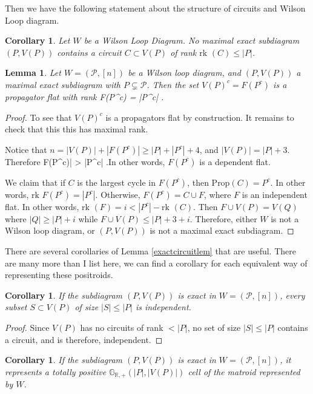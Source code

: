 \documentclass[11pt]{article}
\newcommand{\R}{\mathbb{R}}
\newcommand{\Grtnn}{\mathbb{G}_{\R, +}}
\newcommand{\rk}{\textrm{rk }}
\def\bas #1\eas{\begin{align*} #1 \end{align*}}
\newcommand{\cP}{\mathcal{P}}
\newcommand{\Prop}{\textrm{Prop}}
\newtheorem{lem}[thm]{Lemma}
\newtheorem{cor}[thm]{Corollary}
\theoremstyle{remark}
\theoremstyle{definition}
\begin{document}
Then we have the following statement about the structure of circuits and Wilson Loop diagram.

\begin{cor}
Let $W$ be a Wilson Loop Diagram. No maximal exact subdiagram $(P, V(P))$ contains a circuit $C \subset V(P)$ of rank $\rk(C) \leq |P|$.
\end{cor}


\begin{lem}
Let $W = (\cP, [n])$ be a Wilson loop diagram, and $(P, V(P))$ a maximal exact subdiagram with $P \subsetneq \cP$. Then the set $V(P)^c = F(P^c)$ is a propagator flat with rank  \bas \rk F(P^c) = |P^c| \;. \eas
\end{lem}

\begin{proof}
To see that $V(P)^c$ is a propagators flat by construction. It remains to check that this this has maximal rank.

Notice that $n= |V(P)| + |F(P^c)| \geq |P| + |P^c| +4$, and $|V(P)| = |P| +3$. Therefore \bas |F(P^c)| > |P^c| \;.\eas In other words, $F(P^c)$ is a dependent flat.

We claim that if $C$ is the largest cycle in $F(P^c)$, then $\Prop(C) = P^c$. In other words, $\rk F(P^c) = |P^c|$. Otherwise, $F(P^c) = C \cup F$, where $F$ is an independent flat. In other words, $\rk (F) = i < |P^c| - \rk (C)$. Then $F \cup V(P) = V(Q)$ where $|Q| \geq |P| +i$ while $F \cup V(P) \leq |P| + 3 + i$. Therefore, either $W$ is not a Wilson loop diagram, or $(P, V(P))$ is not a maximal exact subdiagram.
\end{proof}


There are several corollaries of Lemma \ref{exactcircuitlem} that are useful. There are many more than I list here, we can find a corollary for each equivalent way of representing these positroids.

\begin{cor} \label{exactindepcor}
If the subdiagram $(P, V(P))$ is exact in $W= (\cP, [n])$, every subset $S \subset V(P)$ of size $|S| \leq |P|$ is independent.
\end{cor}

\begin{proof}
Since $V(P)$ has no circuits of rank $< |P|$, no set of size $|S| \leq |P|$ contains a circuit, and is therefore, independent.
\end{proof}

\begin{cor} \label{exactposcor}
If the subdiagram $(P, V(P))$ is exact in $W= (\cP, [n])$, it represents a totally positive $\Grtnn(|P|, |V(P)|)$ cell of the matroid represented by $W$.
\end{cor}
\end{document}
